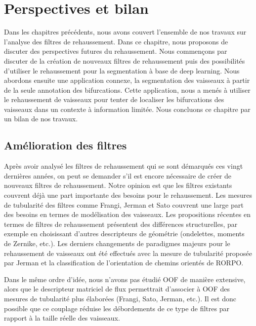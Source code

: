 \chapter{Perspectives et bilan}
\label{sec:Ending}

Dans les chapitres précédents, nous avons couvert l'ensemble de nos travaux sur l'analyse des filtres de rehaussement. Dans ce chapitre, nous proposons de discuter des perspectives futures du rehaussement. Nous commençons par discuter de la création de nouveaux filtres de rehaussement puis des possibilités d'utiliser le rehaussement pour la segmentation à base de deep learning. Nous abordons ensuite une application connexe, la segmentation des vaisseaux à partir de la seule annotation des bifurcations. Cette application, nous a menés à utiliser le rehaussement de vaisseaux pour tenter de localiser les bifurcations des vaisseaux dans un contexte à information limitée. Nous concluons ce chapitre par un bilan de nos travaux.
\section{Amélioration des filtres}
Après avoir analysé les filtres de rehaussement qui se sont démarqués ces vingt dernières années, on peut se demander s'il est encore nécessaire de créer de nouveaux filtres de rehaussement. Notre opinion est que les filtres existants couvrent déjà une part importante des besoins pour le rehaussement. Les mesures de tubularité des filtres comme Frangi, Jerman et Sato couvrent une large part des besoins en termes de modélisation des vaisseaux. Les propositions récentes en termes de filtres de rehaussement présentent des différences structurelles, par exemple en choisissant d'autres descripteurs de géométrie (ondelettes, moments de Zernike, etc.). Les derniers changements de paradigmes majeurs pour le rehaussement de vaisseaux ont été effectués avec la mesure de tubularité proposée par Jerman et la classification de l'orientation de chemins orientés de RORPO.

Dans le même ordre d'idée, nous n'avons pas étudié OOF de manière extensive, alors que le descripteur matriciel de flux permettrait d'associer à OOF des mesures de tubularité plus élaborées (Frangi, Sato, Jerman, etc.). Il est donc possible que ce couplage réduise les débordements de ce type de filtres par rapport à la taille réelle des vaisseaux.

